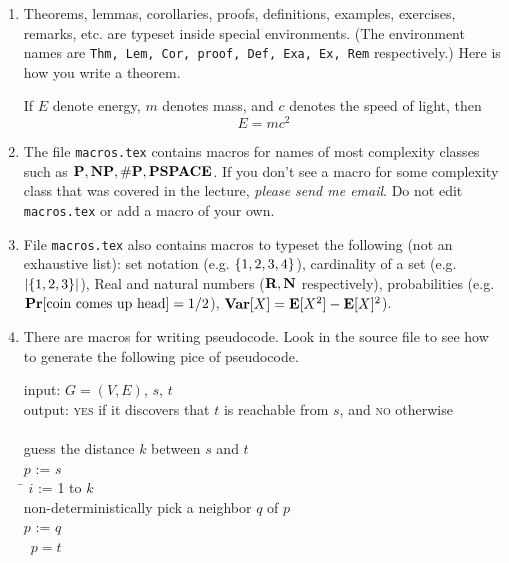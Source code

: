 \begin{enumerate}

\item Theorems, lemmas, corollaries, proofs, definitions, examples, exercises,
remarks, etc. are typeset
inside special environments. (The environment names are 
{\tt Thm, Lem, Cor, proof, Def, Exa, Ex, Rem} respectively.) 
Here is how you write a theorem.

\begin{Thm} \label{einsteinthm}
If $E$ denote energy, $m$ denotes mass, and $c$ denotes the speed of light,
then
\begin{equation}
E = mc^2
\end{equation}
\end{Thm}

\item The file {\tt macros.tex} contains macros for names of 
most complexity classes such as $\p, \np, \sharpp, \pspace$. 
If you don't see a macro for some complexity class that
was covered in the lecture, {\em please send me email}. Do not edit 
{\tt macros.tex} or add a macro of your own.

\item File {\tt macros.tex} also contains macros to typeset the following
(not an exhaustive list): set notation (e.g. $\left\{1, 2, 3, 4\right\}$),
cardinality of a set (e.g. $\left| \left\{1,2,3\right\} \right|$), Real and natural numbers
($\mbox{\bf R}, \mbox{\bf N}$ respectively), probabilities (e.g. $\mbox{\bf Pr}[\text{coin comes up head}] =1/2$), $\mbox{\bf Var}[X] = \mbox{\bf E}[X^2] - \mbox{\bf E}[X]^2$). 

\item There are macros for writing pseudocode. Look in the
source file to see how to generate the following pice of
pseudocode.

\begin{program}
input: $G = (V,E)$, $s$, $t$ \\
output: \textsc{yes} if it discovers that $t$ is  reachable from $s$, 
and \textsc{no} otherwise \\
\\
        \>     guess the distance $k$ between $s$ and $t$\\
        \>     $p$ := $s$\\
    	\>     \FOR \= $i$ := 1 to $k$ \DO \\
        \>     \> non-deterministically pick a neighbor $q$ of $p$ \\
        \>     \> $p$ := $q$ \\
        \>     \IF\ $p=t$ \THEN\ \ACCEPT\\ 
        \>     \> \ELSE \REJECT 
\\
\end{program}



\end{enumerate}
